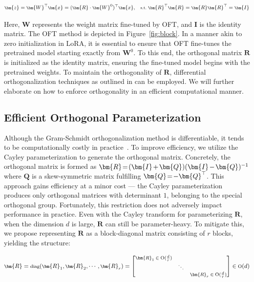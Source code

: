 \begin{equation}\label{eq:oft_general}
    \footnotesize
    \bm{z}=\bm{W}^\top\bm{x}=(\bm{R}\cdot\bm{W}^0)^\top\bm{x},~~~\text{s.t.}~\bm{R}^\top\bm{R}=\bm{R}\bm{R}^\top=\bm{I}
\end{equation}

Here, $\bm{W}$ represents the weight matrix fine-tuned by OFT, and $\bm{I}$ is the identity matrix. The OFT method is depicted in Figure~\ref{fig:block}. In a manner akin to zero initialization in LoRA, it is essential to ensure that OFT fine-tunes the pretrained model starting exactly from $\bm{W}^0$. To this end, the orthogonal matrix $\bm{R}$ is initialized as the identity matrix, ensuring the fine-tuned model begins with the pretrained weights. To maintain the orthogonality of $\bm{R}$, differential orthogonalization techniques as outlined in \cite{liu2021orthogonal,lezcano2019cheap} can be employed. We will further elaborate on how to enforce orthogonality in an efficient computational manner.

\subsection{Efficient Orthogonal Parameterization}\label{sect:eff_ortho}

Although the Gram-Schmidt orthogonalization method is differentiable, it tends to be computationally costly in practice~\cite{liu2021orthogonal}. To improve efficiency, we utilize the Cayley parameterization to generate the orthogonal matrix. Concretely, the orthogonal matrix is formed as $\thickmuskip=2mu \medmuskip=2mu \bm{R}=(\bm{I}+\bm{Q})(\bm{I}-\bm{Q})^{-1}$ where $\bm{Q}$ is a skew-symmetric matrix fulfilling $\thickmuskip=2mu \medmuskip=2mu \bm{Q}=-\bm{Q}^\top$. This approach gains efficiency at a minor cost — the Cayley parameterization produces only orthogonal matrices with determinant $1$, belonging to the special orthogonal group. Fortunately, this restriction does not adversely impact performance in practice. Even with the Cayley transform for parameterizing $\bm{R}$, when the dimension $d$ is large, $\bm{R}$ can still be parameter-heavy. To mitigate this, we propose representing $\bm{R}$ as a block-diagonal matrix consisting of $r$ blocks, yielding the structure:

\begin{equation}
    \footnotesize
    \bm{R}=\text{diag}(\bm{R}_1,\bm{R}_2,\cdots,\bm{R}_r)=\begin{bmatrix}
    \bm{R}_1\in \text{O}(\frac{d}{r}) &  &\\
    &\ddots & \\
    & & \bm{R}_r\in \text{O}(\frac{d}{r})
    \end{bmatrix}\in \text{O}(d)
\end{equation}

